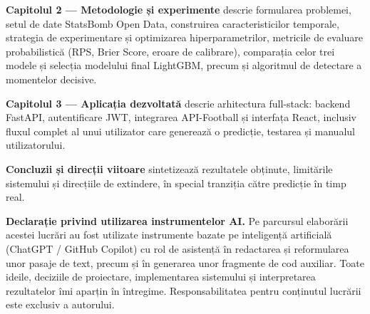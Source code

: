 \textbf{Capitolul 2 --- Metodologie și experimente} descrie formularea
problemei, setul de date StatsBomb Open Data, construirea caracteristicilor
temporale, strategia de experimentare și optimizarea hiperparametrilor,
metricile de evaluare probabilistică (RPS, Brier Score, eroare de calibrare),
comparația celor trei modele și selecția modelului final LightGBM, precum și
algoritmul de detectare a momentelor decisive.

\textbf{Capitolul 3 --- Aplicația dezvoltată} descrie arhitectura
full-stack: backend FastAPI, autentificare JWT, integrarea API-Football
și interfața React, inclusiv fluxul complet al unui utilizator care
generează o predicție, testarea și manualul utilizatorului.

\textbf{Concluzii și direcții viitoare} sintetizează rezultatele
obținute, limitările sistemului și direcțiile de extindere, în special
tranziția către predicție în timp real.

\bigskip
\noindent\hrulefill
\bigskip

\noindent\textbf{Declarație privind utilizarea instrumentelor AI.}
Pe parcursul elaborării acestei lucrări au fost utilizate instrumente
bazate pe inteligență artificială (ChatGPT / GitHub Copilot) cu rol de
asistență în redactarea și reformularea unor pasaje de text, precum și
în generarea unor fragmente de cod auxiliar. Toate ideile, deciziile de
proiectare, implementarea sistemului și interpretarea rezultatelor îmi
aparțin în întregime. Responsabilitatea pentru conținutul lucrării este
exclusiv a autorului.